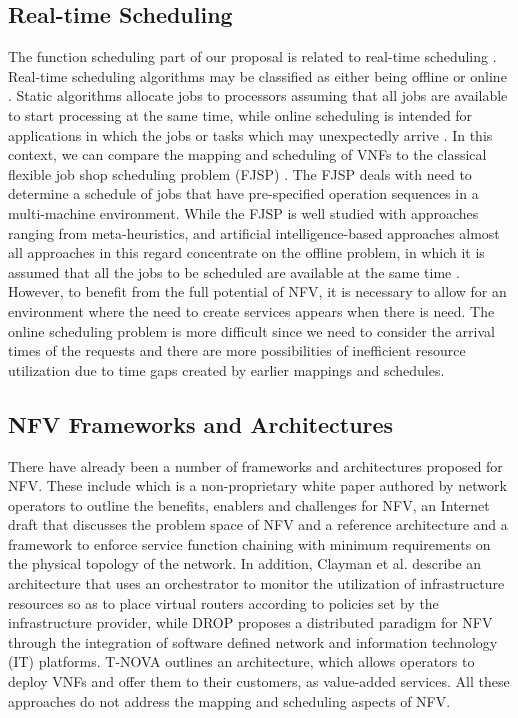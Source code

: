 \documentclass[conference]{IEEEtran}
\begin{document}
\subsection{Real-time Scheduling}
The function scheduling part of our proposal is related to real-time scheduling \cite{Menglan14}. Real-time scheduling algorithms may be classified as either being offline \cite{JiaXu90, Ramamritham95} or online \cite{Menglan14, Stankovic94}. Static algorithms allocate jobs to processors assuming that all jobs are available to start processing at the same time, while online scheduling is intended for applications in which the jobs or tasks which may unexpectedly arrive \cite{Menglan14}. In this context, we can compare the mapping and scheduling of VNFs to the classical flexible job shop scheduling problem (FJSP) \cite{Chakraborty2009}. The FJSP deals with need to determine a schedule of jobs that have pre-specified operation sequences in a multi-machine environment. While the FJSP is well studied with approaches ranging from meta-heuristics, and artificial intelligence-based approaches \cite{Roshanaei13} almost all approaches in this regard concentrate on the offline problem, in which it is assumed that all the jobs to be scheduled are available at the same time \cite{GuiJuan08}. However, to benefit from the full potential of NFV, it is necessary to allow for an environment where the need to create services appears when there is need. The online scheduling problem is more difficult since we need to consider the arrival times of the requests and there are more possibilities of inefficient resource utilization due to time gaps created by earlier mappings and schedules.

\subsection{NFV Frameworks and Architectures}
There have already been a number of frameworks and architectures proposed for NFV. These include \cite{Guerzoni12} which is a non-proprietary white paper authored by network operators to outline the benefits, enablers and challenges for NFV, \cite{XuJiang14}  an Internet draft that discusses the problem space of NFV and \cite{Boucadair14} a reference architecture and a framework to enforce service function chaining with minimum requirements on the physical topology of the network. In addition, Clayman et al. \cite{SClayman14} describe an architecture that uses an orchestrator to monitor the utilization of infrastructure resources so as to place virtual routers according to policies set by the infrastructure provider, while DROP \cite{Bolla14} proposes a distributed paradigm for NFV through the integration of software defined network \cite{Shid14} and information technology (IT) platforms. T-NOVA \cite{Xilouris14} outlines an architecture, which allows operators to deploy VNFs and offer them to their customers, as value-added services. All these approaches do not address the mapping and scheduling aspects of NFV.
\end{document}
